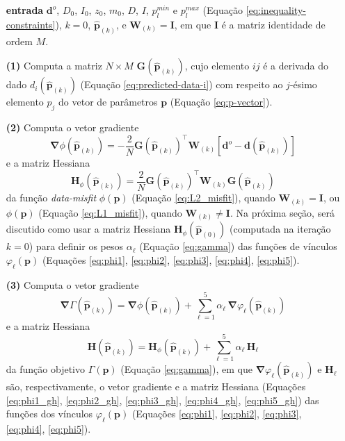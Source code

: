 \begin{itemize}
	\item[\textbf{entrada}] $\mathbf{d}^{o}$, $D_{0}$, $I_{0}$, $z_{0}$, 
	$m_{0}$, $D$, $I$, $p_{l}^{min}$ e $p_{l}^{max}$ (Equação 
	\ref{eq:inequality-constraints}), $k = 0$, $\hat{\mathbf{p}}_{(k)}$, e
	$\mathbf{W}_{(k)} = \mathbf{I}$, em que $\mathbf{I}$ é a matriz identidade de ordem $M$.
	\item[\textbf{(1)}] Computa a matriz $N \times M$ $\mathbf{G}(\hat{\mathbf{p}}_{(k)})$, cujo elemento $ij$ é a derivada do dado $d_{i}(\hat{\mathbf{p}}_{(k)})$ 
	(Equação \ref{eq:predicted-data-i}) com respeito ao $j$-ésimo elemento $p_{j}$ do vetor de parâmetros $\mathbf{p}$ (Equação \ref{eq:p-vector}).
	\item[\textbf{(2)}] Computa o vetor gradiente 
	$$
	\boldsymbol{\nabla} \phi(\hat{\mathbf{p}}_{(k)}) = 
	- \frac{2}{N} \mathbf{G}(\hat{\mathbf{p}}_{(k)})^{\top} 
	\mathbf{W}_{(k)} 
	\left[ \mathbf{d}^{o} - \mathbf{d}(\hat{\mathbf{p}}_{(k)}) \right]
	$$
	e a matriz Hessiana
	$$
	\mathbf{H}_{\phi}(\hat{\mathbf{p}}_{(k)}) = \frac{2}{N} 
	\mathbf{G}(\hat{\mathbf{p}}_{(k)})^{\top} \mathbf{W}_{(k)} 
	\mathbf{G}(\hat{\mathbf{p}}_{(k)})
	$$
	da função \textit{data-misfit} $\phi (\mathbf{p})$ (Equação \ref{eq:L2_misfit}),
	quando $\mathbf{W}_{(k)} = \mathbf{I}$, ou $\phi (\mathbf{p})$ 
	(Equação \ref{eq:L1_misfit}), quando $\mathbf{W}_{(k)} \ne \mathbf{I}$.
	Na próxima seção, será discutido como usar a matriz Hessiana 
	$\mathbf{H}_{\phi}(\hat{\mathbf{p}}_{(0)})$ (computada na iteração $k = 0$) 
	para definir os pesos $\alpha_{\ell}$ (Equação \ref{eq:gamma}) das funções de vínculos $\varphi_{\ell}(\mathbf{p})$ 
	(Equações \ref{eq:phi1}, \ref{eq:phi2}, \ref{eq:phi3}, \ref{eq:phi4}, \ref{eq:phi5}).
	\item[\textbf{(3)}] Computa o vetor gradiente 
	$$
	\boldsymbol{\nabla}\Gamma(\hat{\mathbf{p}}_{(k)}) = 
	\boldsymbol{\nabla}\phi (\hat{\mathbf{p}}_{(k)}) + 
	\sum\limits^{5}_{\ell =1} \alpha_{\ell} \, \boldsymbol{\nabla}\varphi_{\ell}(\hat{\mathbf{p}}_{(k)}) 
	$$ 
	e a matriz Hessiana
	$$
	\mathbf{H}(\hat{\mathbf{p}}_{(k)}) = 
	\mathbf{H}_\phi (\hat{\mathbf{p}}_{(k)}) + \sum\limits^{5}_{\ell =1} \alpha_{\ell} 
	\, \mathbf{H}_{\ell}
	$$ 
	da função objetivo $\Gamma (\mathbf{p})$ (Equação \ref{eq:gamma}),
	em que $\boldsymbol{\nabla}\varphi_{\ell}(\hat{\mathbf{p}}_{(k)})$ e
	$\mathbf{H}_{\ell}$ são, respectivamente, o vetor gradiente e a matriz Hessiana (Equações \ref{eq:phi1_gh}, \ref{eq:phi2_gh}, \ref{eq:phi3_gh}, \ref{eq:phi4_gh}, \ref{eq:phi5_gh}) das funções dos vínculos $\varphi_{\ell}(\mathbf{p})$ (Equações \ref{eq:phi1}, \ref{eq:phi2}, \ref{eq:phi3}, \ref{eq:phi4}, \ref{eq:phi5}).	

\end{itemize}
